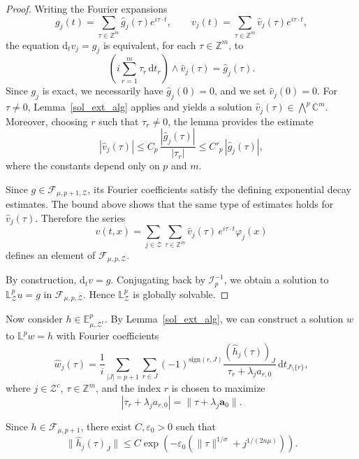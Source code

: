\documentclass[12pt,reqno]{amsart}
\theoremstyle{definition}
\numberwithin{equation}{section}
\begin{document}
\begin{proof}
	Writing the Fourier expansions
	\[
	g_j(t)=\sum_{\tau\in\mathbb{Z}^m}\widehat g_j(\tau)e^{i\tau\cdot t},
	\qquad
	v_j(t)=\sum_{\tau\in\mathbb{Z}^m}\widehat v_j(\tau)e^{i\tau\cdot t},
	\]
	the equation $\mathrm{d}_t v_j=g_j$ is equivalent, for each $\tau\in\mathbb{Z}^m$, to
	\[
	\left(i\sum_{r=1}^m\tau_r\,\mathrm{d}t_r\right)\wedge \widehat v_j(\tau)
	=
	\widehat g_j(\tau).
	\]
		Since $g_j$ is exact, we necessarily have $\widehat g_j(0)=0$,
	and we set $\widehat v_j(0)=0$.
	For $\tau\neq0$, Lemma~\ref{sol_ext_alg} applies and yields a solution
	$\widehat v_j(\tau)\in\textstyle\bigwedge^p\mathbb{C}^m$.
	Moreover, choosing $r$ such that $\tau_r\neq0$, the lemma provides the estimate
	\[
	|\widehat v_j(\tau)|
	\le
	C_p\,\frac{|\widehat g_j(\tau)|}{|\tau_r|}
	\le
	C'_p\,|\widehat g_j(\tau)|,
	\]
	where the constants depend only on $p$ and $m$.
	
	Since $g\in\mathscr{F}_{\mu,p+1,\mathcal{Z}}$,
	its Fourier coefficients satisfy the defining exponential decay estimates.
	The bound above shows that the same type of estimates holds for
	$\widehat v_j(\tau)$.
	Therefore the series
	\[
	v(t,x)
	=
	\sum_{j\in\mathcal{Z}}
	\sum_{\tau\in\mathbb{Z}^m}
	\widehat v_j(\tau)\,e^{i\tau\cdot t}\varphi_j(x)
	\]
	defines an element of $\mathscr{F}_{\mu,p,\mathcal{Z}}$.
	
	By construction, $\mathrm{d}_t v=g$. 
	Conjugating back by $\mathscr{I}_p^{-1}$,
	we obtain a solution to $\mathbb{L}^p_{\mathcal{Z}}u=g$ in
	$\mathscr{F}_{\mu,p,\mathcal{Z}}$.
	Hence $\mathbb{L}^p_{\mathcal{Z}}$ is globally solvable.
\end{proof}







Now consider $h \in \mathbb{E}^p_{\mu,\mathcal{Z}^c}$. By Lemma~\ref{sol_ext_alg}, we can construct a solution $w$ to $\mathbb{L}^p w = h$ with Fourier coefficients
\[
\widehat{w}_j(\tau) = \frac{1}{i} \sum_{|J| = p+1} \sum_{r \in J} (-1)^{\mathrm{sign}(r, J)} \frac{(\widehat{h}_j(\tau))_J}{\tau_r + \lambda_j a_{r,0}} \, \mathrm{d}t_{J \setminus \{r\}},
\]
where $j \in \mathcal{Z}^c$, $\tau \in \mathbb{Z}^m$, and the index $r$ is chosen to maximize 
\[
|\tau_r + \lambda_j a_{r,0}| = \| \tau + \lambda_j \boldsymbol{a}_0 \|.
\]

Since $h \in \mathscr{F}_{\mu,p+1}$, there exist  \(C, \varepsilon_0>0\) such that
\[
\| \widehat{h}_j(\tau)_J \| \leq C \exp\left( - \varepsilon_0 \left( \|\tau\|^{1/\sigma} + j^{1/(2n\mu)} \right) \right).
\]
\end{document}
